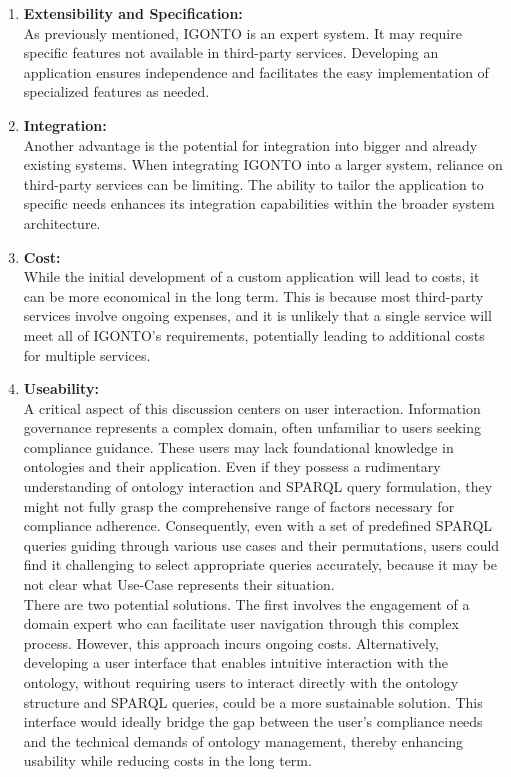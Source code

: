 \documentclass[
  a4paper,  %
  twoside,  %
  bibliography=totoc,
  headsepline,
  cleardoublepage=empty,
  parskip=half,
  draft=false
]{scrbook}
\begin{document}
\begin{enumerate}
    \item \textbf{Extensibility and Specification:} \\
    As previously mentioned, IGONTO is an expert system. It may require specific features not available in third-party services. Developing an application ensures independence and facilitates the easy implementation of specialized features as needed.
    
    \item \textbf{Integration:} \\
    Another advantage is the potential for integration into bigger and already existing systems. When integrating IGONTO into a larger system, reliance on third-party services can be limiting. The ability to tailor the application to specific needs enhances its integration capabilities within the broader system architecture.
    
    \item \textbf{Cost:} \\
    While the initial development of a custom application will lead to costs, it can be more economical in the long term. This is because most third-party services involve ongoing expenses, and it is unlikely that a single service will meet all of IGONTO's requirements, potentially leading to additional costs for multiple services. 

    \item \textbf{Useability:}\\
    A critical aspect of this discussion centers on user interaction. Information governance represents a complex domain, often unfamiliar to users seeking compliance guidance. These users may lack foundational knowledge in ontologies and their application. Even if they possess a rudimentary understanding of ontology interaction and SPARQL query formulation, they might not fully grasp the comprehensive range of factors necessary for compliance adherence. Consequently, even with a set of predefined SPARQL queries guiding through various use cases and their permutations, users could find it challenging to select appropriate queries accurately, because it may be not clear what Use-Case represents their situation.\\
    There are two potential solutions. The first involves the engagement of a domain expert who can facilitate user navigation through this complex process. However, this approach incurs ongoing costs. Alternatively, developing a user interface that enables intuitive interaction with the ontology, without requiring users to interact directly with the ontology structure and SPARQL queries, could be a more sustainable solution. This interface would ideally bridge the gap between the user's compliance needs and the technical demands of ontology management, thereby enhancing usability while reducing costs in the long term.
\end{enumerate}
\end{document}

